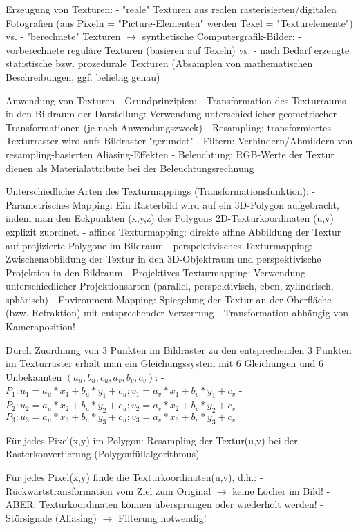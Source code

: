\documentclass[10pt,landscape]{article}
\begin{document}
\begin{multicols}{3}
  Erzeugung von Texturen:
  - "reale" Texturen aus realen rasterisierten/digitalen Fotografien (aus Pixeln = "Picture-Elementen" werden Texel = "Texturelemente") vs.
  - "berechnete" Texturen $\rightarrow$ synthetische Computergrafik-Bilder:
  - vorberechnete reguläre Texturen (basieren auf Texeln) vs.
  - nach Bedarf erzeugte statistische bzw. prozedurale Texturen (Absamplen von mathematischen Beschreibungen, ggf. beliebig genau)
  
  Anwendung von Texturen - Grundprinzipien:
  - Transformation des Texturraums in den Bildraum der Darstellung: Verwendung unterschiedlicher geometrischer Transformationen (je nach Anwendungszweck)
  - Resampling: transformiertes Texturraster wird aufs Bildraster "gerundet"
  - Filtern: Verhindern/Abmildern von resampling-basierten Aliasing-Effekten
  - Beleuchtung: RGB-Werte der Textur dienen als Materialattribute bei der Beleuchtungsrechnung
  
  Unterschiedliche Arten des Texturmappings (Transformationsfunktion):
  - Parametrisches Mapping: Ein Rasterbild wird auf ein 3D-Polygon aufgebracht, indem man den Eckpunkten (x,y,z) des Polygons 2D-Texturkoordinaten (u,v) explizit zuordnet.
  - affines Texturmapping: direkte affine Abbildung der Textur auf projizierte Polygone im Bildraum
  - perspektivisches Texturmapping: Zwischenabbildung der Textur in den 3D-Objektraum und perspektivische Projektion in den Bildraum
  - Projektives Texturmapping: Verwendung unterschiedlicher Projektionsarten (parallel, perspektivisch, eben, zylindrisch, sphärisch)
  - Environment-Mapping: Spiegelung der Textur an der Oberfläche (bzw. Refraktion) mit entsprechender Verzerrung
  - Transformation abhängig von Kameraposition!
  
  Durch Zuordnung von 3 Punkten im Bildraster zu den entsprechenden 3 Punkten im Texturraster erhält man ein Gleichungssystem mit 6 Gleichungen und 6 Unbekannten $(a_u , b_u , c_u , a_v , b_v , c_v )$:
  - $P_1: u_1=a_u*x_1+b_u*y_1+c_u; v_1=a_v*x_1+b_v*y_1+c_v$
  - $P_2: u_2=a_u*x_2+b_u*y_2+c_u; v_2=a_v*x_2+b_v*y_2+c_v$
  - $P_3: u_3=a_u*x_3+b_u*y_3+c_u; v_3=a_v*x_3+b_v*y_3+c_v$
  
  Für jedes Pixel(x,y) im Polygon: Resampling der Textur(u,v) bei der Rasterkonvertierung (Polygonfüllalgorithmus)
  
  Für jedes Pixel(x,y) finde die Texturkoordinaten(u,v), d.h.:
  - Rückwärtstransformation vom Ziel zum Original $\rightarrow$ keine Löcher im Bild!
  - ABER: Texturkoordinaten können übersprungen oder wiederholt werden!
  - Störsignale (Aliasing) $\rightarrow$ Filterung notwendig!
  

\end{multicols}
\end{document}

